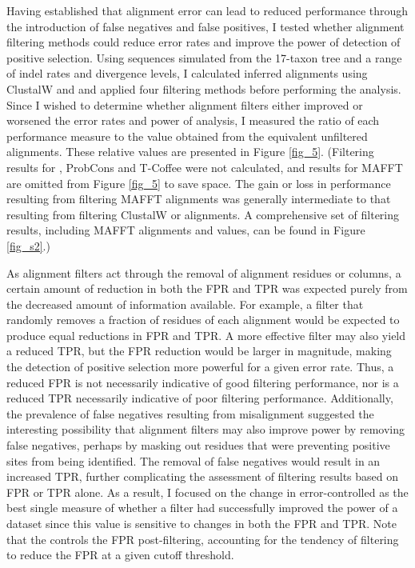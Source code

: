 Having established that alignment error can lead to reduced \sw
performance through the introduction of false negatives and false
positives, I tested whether alignment filtering methods could reduce
error rates and improve the power of \sw detection of positive
selection. Using sequences simulated from the 17-taxon tree and a
range of indel rates and divergence levels, I calculated inferred
alignments using ClustalW and \prankc and applied four filtering
methods before performing the \sw analysis. Since I wished to
determine whether alignment filters either improved or worsened the
error rates and power of \sw analysis, I measured the ratio of each
performance measure to the value obtained from the equivalent
unfiltered alignments. These relative values are presented in Figure
\ref{fig_5}. (Filtering results for \pranka, ProbCons and
  T-Coffee were not calculated, and results for MAFFT are omitted from
  Figure \ref{fig_5} to save space. The gain or loss in performance
  resulting from filtering MAFFT alignments was generally intermediate
  to that resulting from filtering ClustalW or \prankc alignments. A
  comprehensive set of filtering results, including MAFFT alignments
  and \tprf values, can be found in Figure \ref{fig_s2}.)

As alignment filters act through the removal of alignment residues or
columns, a certain amount of reduction in both the FPR and TPR was expected
purely from the decreased amount of information available. For
example, a filter that randomly removes a fraction of residues of each
alignment would be expected to produce equal reductions in FPR and
TPR. A more effective filter may also yield a reduced TPR, but the FPR
reduction would be larger in magnitude, making the detection of
positive selection more powerful for a given error rate. Thus, a
reduced FPR is not necessarily indicative of good filtering
performance, nor is a reduced TPR necessarily indicative of poor
filtering performance. Additionally, the prevalence of false negatives
resulting from misalignment suggested the interesting possibility that alignment filters may also
improve power by removing false negatives, perhaps by masking out
residues that were preventing positive sites from being
identified. The removal of false negatives would result in an
increased TPR, further complicating the assessment of filtering
results based on FPR or TPR alone. As a result, I focused on the
change in error-controlled \tpr{} as the best single measure of
whether a filter had successfully improved the \sw power of a dataset
since this value is sensitive to changes in both the FPR and TPR. Note
that the \tpr controls the FPR post-filtering, accounting for the
tendency of filtering to reduce the FPR at a given cutoff threshold.

